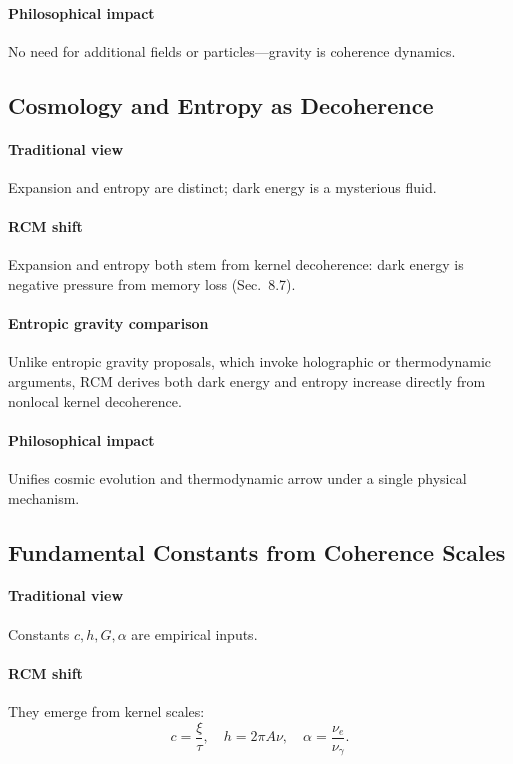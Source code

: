 \paragraph{Philosophical impact}  
No need for additional fields or particles—gravity is coherence dynamics.

\subsection*{Cosmology and Entropy as Decoherence}

\paragraph{Traditional view}  
Expansion and entropy are distinct; dark energy is a mysterious fluid.

\paragraph{RCM shift}  
Expansion and entropy both stem from kernel decoherence: dark energy is negative pressure from memory loss (Sec.~8.7).

\paragraph{Entropic gravity comparison}  
Unlike entropic gravity proposals, which invoke holographic or thermodynamic arguments, RCM derives both dark energy and entropy increase directly from nonlocal kernel decoherence.

\paragraph{Philosophical impact}  
Unifies cosmic evolution and thermodynamic arrow under a single physical mechanism.

\subsection*{Fundamental Constants from Coherence Scales}

\paragraph{Traditional view}  
Constants \(c,h,G,\alpha\) are empirical inputs.

\paragraph{RCM shift}  
They emerge from kernel scales:
\[
c=\frac{\xi}{\tau},\quad
h=2\pi A\nu,\quad
\alpha=\frac{\nu_e}{\nu_\gamma}.
\]

